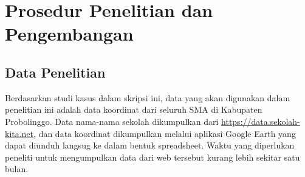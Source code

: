 \section{Prosedur Penelitian dan Pengembangan}


\subsection{Data Penelitian}
    
Berdasarkan studi kasus dalam skripsi ini, data yang akan digunakan dalam penelitian ini adalah data koordinat dari seluruh SMA di Kabupaten Probolinggo. Data nama-nama sekolah dikumpulkan dari \url{https://data.sekolah-kita.net}, dan data koordinat dikumpulkan melalui aplikasi Google Earth yang dapat diunduh langsug ke dalam bentuk spreadsheet. Waktu yang diperlukan peneliti untuk mengumpulkan data dari web tersebut kurang lebih sekitar satu bulan.

